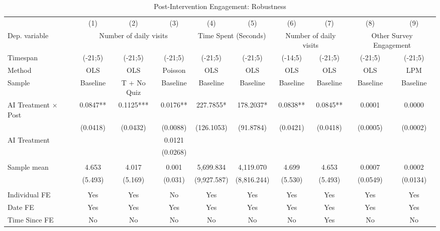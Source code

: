  \begin{table}[H]
 \centering 
 \caption{Post-Intervention Engagement: Robustness} 
 \label{tab:results_visits_robust} 
 \begin{adjustbox}{max width=\textwidth} 
\begin{tabular}{lccccccccc} 
 \toprule
 \midrule
& (1) & (2) & (3) & (4) & (5) & (6) & (7) & (8) & (9)  \\
 Dep. variable & \multicolumn{3}{c}{Number of daily visits} & \multicolumn{2}{c}{Time Spent (Seconds)} & \multicolumn{2}{c}{Number of daily visits} & \multicolumn{2}{c}{Other Survey Engagement}  \\ 
 \cmidrule(lr){2-4} \cmidrule(lr){5-6} \cmidrule(lr){7-8} \cmidrule(lr){9-10}
Timespan & (-21;5) & (-21;5) & (-21;5) & (-21;5) & (-21;5) & (-14;5) & (-21;5) & (-21;5) & (-21;5) \\
 \cmidrule(lr){2-10}
Method & OLS & OLS & Poisson & OLS & OLS & OLS & OLS & OLS & LPM \\
 \cmidrule(lr){2-10}
Sample & Baseline & T + No Quiz  & Baseline & Baseline & Baseline & Baseline & Baseline & Baseline & Baseline \\
 \midrule 
AI Treatment $\times$ Post&   0.0847** &   0.1125***&   0.0176** & 227.7855*  & 178.2037*  &   0.0838** &   0.0845** &   0.0001   &   0.0000   \\
                & (0.0418)   & (0.0432)   & (0.0088)   &(126.1053)   &(91.8784)   & (0.0421)   & (0.0418)   & (0.0005)   & (0.0002)   \\
AI Treatment    &            &            &   0.0121   &            &            &            &            &            &            \\
                &            &            & (0.0268)   &            &            &            &            &            &            \\
& & & & & & & & &  \\
Sample mean&      4.653 &      4.017 &      0.001 &  5,699.834 &  4,119.070 &      4.699 &      4.653 &     0.0007 &     0.0002  \\
& (5.493) & (5.169) & (0.031) & (9,927.587) & (8,816.244) & (5.530) & (5.493) & (0.0549) & (0.0134)  \\
& & & & & & & & &  \\
Individual FE & Yes & Yes & No & Yes & Yes & Yes & Yes & Yes & Yes\\
Date FE & Yes & Yes & Yes & Yes & Yes & Yes & Yes & Yes & Yes \\
Time Since FE & No & No & No & No & No & No & Yes & No & No \\

\end{tabular}
\end{adjustbox}
\end{table}
